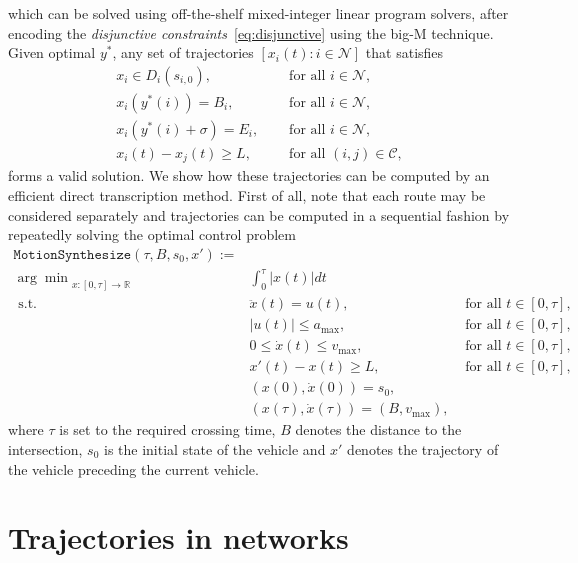\documentclass[a4paper]{article}
\theoremstyle{definition}
\theoremstyle{plain}
\begin{document}
which can be solved using off-the-shelf mixed-integer linear program solvers,
after encoding the \textit{disjunctive constraints}~\eqref{eq:disjunctive} using the big-M
technique. Given optimal $y^{*}$, any set of trajectories
$[x_{i}(t) : i \in \mathcal{N}]$ that satisfies
\begin{subequations}
\begin{align}
  x_{i} \in D_{i}(s_{i,0}) , \quad & \text{ for all } i \in \mathcal{N} , \\
  x_{i}(y^{*}(i)) = B_{i} , \quad & \text{ for all } i \in \mathcal{N} , \\
  x_{i}(y^{*}(i) + \sigma) = E_{i} , \quad & \text{ for all } i \in \mathcal{N} , \\
  x_{i}(t) - x_{j}(t) \geq L , \quad & \text{ for all } (i,j) \in \mathcal{C} ,
\end{align}
\end{subequations}
forms a valid solution. We show how these trajectories can be computed by an
efficient direct transcription method. First of all, note that each route may be
considered separately and trajectories can be computed in a sequential fashion
by repeatedly solving the optimal control problem
%
\begin{align*}
\texttt{MotionSynthesize}(\tau, B, s_{0}, x') := \\
  {\arg\min}_{x: [0, \tau] \rightarrow \mathbb{R}} & \int_{0}^{\tau} |x(t)| dt \\
  \text{ s.t. } & \ddot{x}(t) = u(t) , &  \text{ for all } t \in [0, \tau] , \\
  & |u(t)| \leq a_{\max} , &  \text{ for all } t \in [0, \tau] , \\
  & 0 \leq \dot{x}(t) \leq v_{\max} , &  \text{ for all } t \in [0, \tau] , \\
  & x'(t) - x(t) \geq L , &  \text{ for all } t \in [0, \tau] , \\
  & (x(0), \dot{x}(0)) = s_{0} , \\
  & (x(\tau), \dot{x}(\tau)) = (B, v_{\max}) ,
\end{align*}
where $\tau$ is set to the required crossing time, $B$ denotes the distance to
the intersection, $s_{0}$ is the initial state of the vehicle and $x'$ denotes
the trajectory of the vehicle preceding the current vehicle.


\newpage

\section*{Trajectories in networks}
\end{document}
